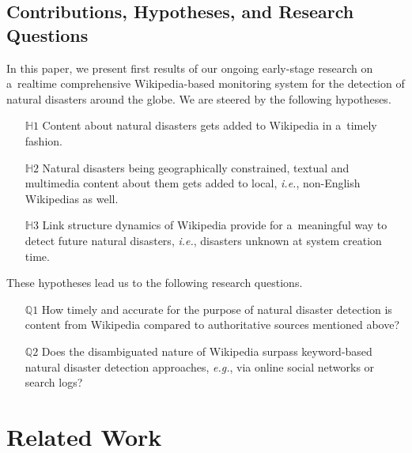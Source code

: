 \documentclass[runningheads,a4paper]{llncs}
\begin{document}
\subsection{Contributions, Hypotheses, and Research Questions}

In this paper, we present first results of
our ongoing early-stage research
on a~realtime comprehensive Wikipedia-based monitoring system
for the detection of natural disasters around the globe.
We are steered by the following hypotheses.

\begin{itemize}
  \itemsep0em
  \item[$\mathbb{H}1$] Content about natural disasters
    gets added to Wikipedia in a~timely fashion.
  \item[$\mathbb{H}2$] Natural disasters being geographically
    constrained, textual and multimedia content about them
    gets added to local, \emph{i.e.}, non-English Wikipedias as well.
  \item[$\mathbb{H}3$] Link structure dynamics of Wikipedia
    provide for a~meaningful way to detect future
    natural disasters, \emph{i.e.}, disasters unknown at system creation time.
\end{itemize}

\noindent These hypotheses lead us to the following research questions.

\begin{itemize}
  \itemsep0em
  \item[$\mathbb{Q}1$] How timely and accurate for the purpose
    of natural disaster detection is content from Wikipedia
    compared to authoritative sources mentioned above?
  \item[$\mathbb{Q}2$] Does the disambiguated nature of Wikipedia
    surpass keyword-based natural disaster detection approaches,
    \emph{e.g.}, via online social networks or search logs?
\end{itemize}

\section{Related Work}
\end{document}
